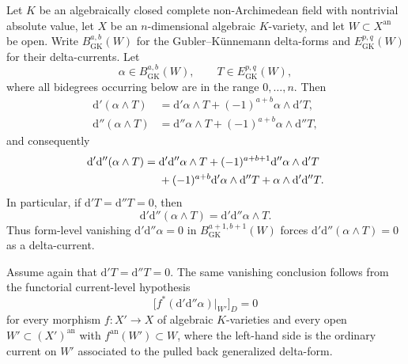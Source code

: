 
\begin{proposition}
\label{prop:p21p3-delta-module}
Let \(K\) be an algebraically closed complete non-Archimedean field with
nontrivial absolute value, let \(X\) be an \(n\)-dimensional algebraic
\(K\)-variety, and let \(W\subset X^{\mathrm{an}}\) be open.  Write
\(B_{\mathrm{GK}}^{a,b}(W)\) for the Gubler--K\"unnemann delta-forms and
\(E_{\mathrm{GK}}^{p,q}(W)\) for their delta-currents.  Let
\[
 \alpha\in B_{\mathrm{GK}}^{a,b}(W),
 \qquad
 T\in E_{\mathrm{GK}}^{p,q}(W),
\]
where all bidegrees occurring below are in the range \(0,\ldots,n\).  Then
\begin{align}
 \mathrm d'(\alpha\wedge T)
 &=\mathrm d'\alpha\wedge T
   +(-1)^{a+b}\alpha\wedge\mathrm d'T,
 \label{eq:p21p3-dprime-module}\\
 \mathrm d''(\alpha\wedge T)
 &=\mathrm d''\alpha\wedge T
   +(-1)^{a+b}\alpha\wedge\mathrm d''T,
 \label{eq:p21p3-ddprime-module}
\end{align}
and consequently
\begin{align}
 \mathrm d'\mathrm d''(\alpha\wedge T)
 ={}&\mathrm d'\mathrm d''\alpha\wedge T
   +(-1)^{a+b+1}\mathrm d''\alpha\wedge\mathrm d'T
 \notag\\
 &+(-1)^{a+b}\mathrm d'\alpha\wedge\mathrm d''T
   +\alpha\wedge\mathrm d'\mathrm d''T.
 \label{eq:p21p3-dd-module}
\end{align}
In particular, if \(\mathrm d'T=\mathrm d''T=0\), then
\begin{equation}
 \mathrm d'\mathrm d''(\alpha\wedge T)
 =\mathrm d'\mathrm d''\alpha\wedge T.
 \label{eq:p21p3-closed-module}
\end{equation}
Thus form-level vanishing
\(\mathrm d'\mathrm d''\alpha=0\) in
\(B_{\mathrm{GK}}^{a+1,b+1}(W)\) forces
\(\mathrm d'\mathrm d''(\alpha\wedge T)=0\) as a delta-current.

Assume again that \(\mathrm d'T=\mathrm d''T=0\).  The same vanishing
conclusion follows from the functorial current-level hypothesis
\begin{equation}
 \bigl[f^*(\mathrm d'\mathrm d''\alpha)|_{W'}\bigr]_{D}=0
 \label{eq:p21p3-all-pullbacks}
\end{equation}
for every morphism \(f:X'\to X\) of algebraic \(K\)-varieties and every
open \(W'\subset (X')^{\mathrm{an}}\) with
\(f^{\mathrm{an}}(W')\subset W\), where the
left-hand side is the ordinary current on \(W'\) associated to the pulled
back generalized delta-form.


\end{proposition}

